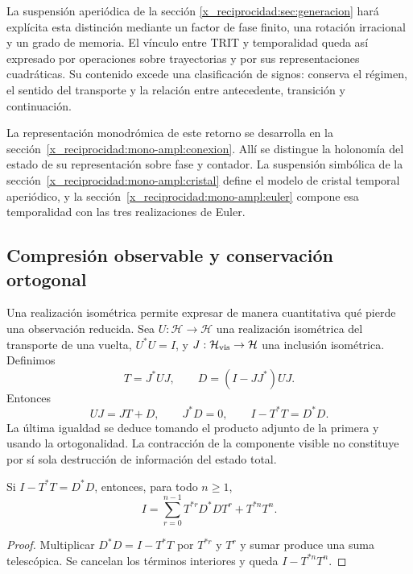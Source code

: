 La suspensión aperiódica de la sección \ref{x_reciprocidad:sec:generacion} hará explícita
esta distinción mediante un factor de fase finito, una rotación irracional
y un grado de memoria. El vínculo entre TRIT y temporalidad queda así
expresado por operaciones sobre trayectorias y por sus representaciones
cuadráticas. Su contenido excede una clasificación de signos: conserva el
régimen, el sentido del transporte y la relación entre antecedente,
transición y continuación.



La representación monodrómica de este retorno se desarrolla en la
sección~\ref{x_reciprocidad:mono-ampl:conexion}. Allí se distingue la holonomía del
estado de su representación sobre fase y contador. La suspensión
simbólica de la sección~\ref{x_reciprocidad:mono-ampl:cristal} define el modelo de
cristal temporal aperiódico, y la sección~\ref{x_reciprocidad:mono-ampl:euler}
compone esa temporalidad con las tres realizaciones de Euler.

\subsection{Compresión observable y conservación ortogonal}

Una realización isométrica permite expresar de manera cuantitativa qué pierde una observación reducida. Sea \(U:\mathcal H\to\mathcal H\) una realización isométrica del transporte de una vuelta, \(U^*U=I\), y \(J:\mathcal H_{\rm vis}\to\mathcal H\) una inclusión isométrica. Definimos
\[
 T=J^*UJ,\qquad D=(I-JJ^*)UJ.
\]
Entonces
\begin{equation}
 UJ=JT+D,\qquad J^*D=0,\qquad I-T^*T=D^*D.
 \label{x_reciprocidad:eq:conservacion-ortogonal}
\end{equation}
La última igualdad se deduce tomando el producto adjunto de la primera y usando la ortogonalidad. La contracción de la componente visible no constituye por sí sola destrucción de información del estado total.

\begin{proposition}
Si \(I-T^*T=D^*D\), entonces, para todo \(n\ge1\),
\begin{equation}
 I=\sum_{r=0}^{n-1}T^{*r}D^*DT^r+T^{*n}T^n.
 \label{x_reciprocidad:eq:telescopia}
\end{equation}
\end{proposition}
\begin{proof}
Multiplicar \(D^*D=I-T^*T\) por \(T^{*r}\) y \(T^r\) y sumar produce una suma telescópica. Se cancelan los términos interiores y queda \(I-T^{*n}T^n\).
\end{proof}

